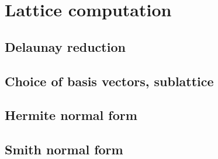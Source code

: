 \section{\label{sec:lattice}Lattice computation}

\subsection{Delaunay reduction}

\subsection{Choice of basis vectors, sublattice}

\subsection{Hermite normal form}

\subsection{Smith normal form}
